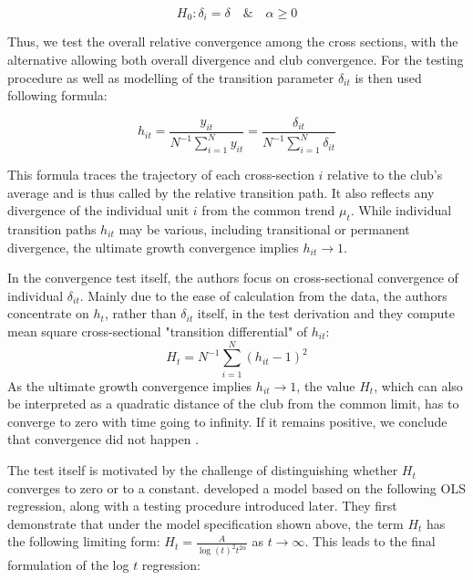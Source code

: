 \documentclass[11pt]{article}
\begin{document}
\begin{equation}
\label{eq6} H_0: \delta_{i} = \delta \quad \& \quad \alpha \geq 0
\end{equation} 

Thus, we test the overall relative convergence among the cross sections, with the alternative allowing both overall divergence and club convergence.
For the testing procedure as well as modelling of the transition parameter $\delta_{it}$ is then used following formula:

\begin{equation}\label{eq8}h_{it} = \frac{y_{it}}{N^{-1}\sum\limits_{i=1}^Ny_{it}} = \frac{\delta_{it}}{N^{-1}\sum\limits_{i=1}^N\delta_{it}}\end{equation}

This formula traces the trajectory of each cross-section $i$ relative to the club's average and is thus called by \citet{phillips2009economic} the relative transition path. It also reflects any divergence of the individual unit $i$ from the common trend $\mu_t$. While individual transition paths $h_{it}$ may be various, including transitional or permanent divergence, the ultimate growth convergence implies \(h_{it} \rightarrow 1\).

In the convergence test itself, the authors focus on cross-sectional convergence of individual $\delta_{it}$. Mainly due to the ease of calculation from the data, the authors concentrate on $h_{t}$, rather than $\delta_{it}$ itself, in the test derivation and they compute mean square cross-sectional "transition differential" of $h_{it}$:
\begin{equation}\label{eq9}H_t = N^{-1}\sum\limits_{i=1}^N(h_{it} - 1)^2 \end{equation}
As the ultimate growth convergence implies \(h_{it} \rightarrow 1\), the value $H_{t}$, which can also be interpreted as a quadratic distance of the club from the common limit, has to converge to zero with time going to infinity. If it remains positive, we conclude that convergence did not happen \citep{phillips2009economic}.

The test itself is motivated by the challenge of distinguishing whether \(H_t\) converges to zero or to a constant. \citet{phillips2007transition} developed a model based on the following OLS regression, along with a testing procedure introduced later. They first demonstrate that under the model specification shown above, the term \(H_{t}\) has the following limiting form: \(H_{t} = \frac{A}{\log (t)^2t^{2\alpha}}\) as \(t \rightarrow \infty\). This leads to the final formulation of the log \(t\) regression:
\end{document}
